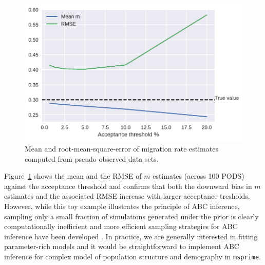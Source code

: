 \documentclass[graybox]{svmult}
\newcommand{\msprime}[0]{\texttt{msprime}}
\begin{document}
\begin{figure}
    \begin{center}
    \includegraphics[width=\textwidth]{images/inference-example_25_0.pdf}
    \end{center}
    \caption{\label{fig:abc-rmse}Mean and root-mean-square-error of
    migration rate estimates computed from pseudo-observed data sets.}
\end{figure}

Figure~\ref{fig:abc-rmse} shows the mean and the RMSE of \(m\) estimates (across 100 PODS) against the acceptance threshold and confirms that both the downward bias in \(m\) estimates and the associated RMSE increase with larger acceptance tresholds. However, while this toy example illustrates the principle of ABC inference, sampling only a small fraction of simulations generated under the prior is clearly computationally inefficient and more efficient sampling strategies for ABC inference have been developed \citep{Beaumont2002}. In practice, we are generally interested in fitting parameter-rich models and it would be straightforward to implement ABC inference for complex model of population structure and demography in \msprime.
\end{document}
